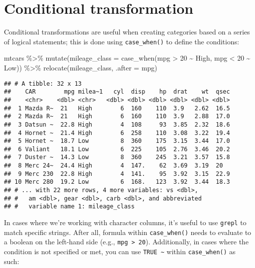 \documentclass[
]{book}
\newenvironment{Shaded}{\begin{snugshade}}{\end{snugshade}}
\newcommand{\AttributeTok}[1]{\textcolor[rgb]{0.77,0.63,0.00}{#1}}
\newcommand{\DecValTok}[1]{\textcolor[rgb]{0.00,0.00,0.81}{#1}}
\newcommand{\FunctionTok}[1]{\textcolor[rgb]{0.00,0.00,0.00}{#1}}
\newcommand{\NormalTok}[1]{#1}
\newcommand{\SpecialCharTok}[1]{\textcolor[rgb]{0.00,0.00,0.00}{#1}}
\newcommand{\StringTok}[1]{\textcolor[rgb]{0.31,0.60,0.02}{#1}}
\begin{document}
\hypertarget{conditional-transformation}{%
\section{Conditional transformation}\label{conditional-transformation}}

Conditional transformations are useful when creating categories based on a series of logical statements; this is done using \texttt{case\_when()} to define the conditions:

\begin{Shaded}
\begin{Highlighting}[]
\NormalTok{mtcars }\SpecialCharTok{\%\textgreater{}\%} \FunctionTok{mutate}\NormalTok{(}\AttributeTok{mileage\_class =} 
  \FunctionTok{case\_when}\NormalTok{(mpg }\SpecialCharTok{\textgreater{}} \DecValTok{20} \SpecialCharTok{\textasciitilde{}} \StringTok{\textquotesingle{}High\textquotesingle{}}\NormalTok{,}
\NormalTok{            mpg }\SpecialCharTok{\textless{}} \DecValTok{20} \SpecialCharTok{\textasciitilde{}} \StringTok{\textquotesingle{}Low\textquotesingle{}}\NormalTok{)) }\SpecialCharTok{\%\textgreater{}\%}
  \FunctionTok{relocate}\NormalTok{(mileage\_class, }\AttributeTok{.after =}\NormalTok{ mpg)}
\end{Highlighting}
\end{Shaded}

\begin{verbatim}
## # A tibble: 32 x 13
##    CAR        mpg milea~1   cyl  disp    hp  drat    wt  qsec
##    <chr>    <dbl> <chr>   <dbl> <dbl> <dbl> <dbl> <dbl> <dbl>
##  1 Mazda R~  21   High        6  160    110  3.9   2.62  16.5
##  2 Mazda R~  21   High        6  160    110  3.9   2.88  17.0
##  3 Datsun ~  22.8 High        4  108     93  3.85  2.32  18.6
##  4 Hornet ~  21.4 High        6  258    110  3.08  3.22  19.4
##  5 Hornet ~  18.7 Low         8  360    175  3.15  3.44  17.0
##  6 Valiant   18.1 Low         6  225    105  2.76  3.46  20.2
##  7 Duster ~  14.3 Low         8  360    245  3.21  3.57  15.8
##  8 Merc 24~  24.4 High        4  147.    62  3.69  3.19  20  
##  9 Merc 230  22.8 High        4  141.    95  3.92  3.15  22.9
## 10 Merc 280  19.2 Low         6  168.   123  3.92  3.44  18.3
## # ... with 22 more rows, 4 more variables: vs <dbl>,
## #   am <dbl>, gear <dbl>, carb <dbl>, and abbreviated
## #   variable name 1: mileage_class
\end{verbatim}

In cases where we're working with character columns, it's useful to use \texttt{grepl} to match specific strings. After all, formula within \texttt{case\_when()} needs to evaluate to a boolean on the left-hand side (e.g., \texttt{mpg\ \textgreater{}\ 20}). Additionally, in cases where the condition is not specified or met, you can use \texttt{TRUE\ \textasciitilde{}} within \texttt{case\_when()} as such:
\end{document}
